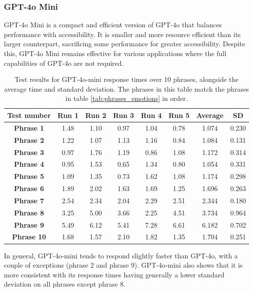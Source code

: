 \subsubsection{GPT-4o Mini}

GPT-4o Mini is a compact and efficient version of GPT-4o that balances performance with accessibility. It is smaller and more resource efficient than its larger counterpart, sacrificing some performance for greater accessibility. Despite this, GPT-4o Mini remains effective for various applications where the full capabilities of GPT-4o are not required.

\begin{table}[h!]
\centering{}
\caption{Test results for GPT-4o-mini response times over 10 phrases, alongside the average time and standard deviation. The phrases in this table match the phrases in table \ref{tab:phrases_emotions} in order.}
\begin{tabular}{|c|c|c|c|c|c|c|c|}
\hline
\textbf{Test number} & \textbf{Run 1} & \textbf{Run 2} & \textbf{Run 3} & \textbf{Run 4} & \textbf{Run 5} & \textbf{Average} & \textbf{SD} \\ \hline
\textbf{Phrase 1}  & 1.48 & 1.10 & 0.97 & 1.04 & 0.78 & 1.074 & 0.230          \\ \hline
\textbf{Phrase 2}  & 1.22 & 1.07 & 1.13 & 1.16 & 0.84 & 1.084 & 0.131          \\ \hline
\textbf{Phrase 3}  & 0.97 & 1.76 & 1.19 & 0.86 & 1.08 & 1.172 & 0.314          \\ \hline
\textbf{Phrase 4}  & 0.95 & 1.53 & 0.65 & 1.34 & 0.80 & 1.054 & 0.331          \\ \hline
\textbf{Phrase 5}  & 1.09 & 1.35 & 0.73 & 1.62 & 1.08 & 1.174 & 0.298          \\ \hline
\textbf{Phrase 6}  & 1.89 & 2.02 & 1.63 & 1.69 & 1.25 & 1.696 & 0.263          \\ \hline
\textbf{Phrase 7}  & 2.54 & 2.34 & 2.04 & 2.29 & 2.51 & 2.344 & 0.180          \\ \hline
\textbf{Phrase 8}  & 3.25 & 5.00 & 3.66 & 2.25 & 4.51 & 3.734 & 0.964          \\ \hline
\textbf{Phrase 9}  & 5.49 & 6.12 & 5.41 & 7.28 & 6.61 & 6.182 & 0.702          \\ \hline
\textbf{Phrase 10} & 1.68 & 1.57 & 2.10 & 1.82 & 1.35 & 1.704 & 0.251          \\ \hline
\end{tabular}
\label{tab:phrase_gpt4o-mini}
\end{table}

In general, GPT-4o-mini tends to respond slightly faster than GPT-4o, with a couple of exceptions (phrase 2 and phrase 9). GPT-4o-mini also shows that it is more consistent with its response times having generally a lower standard deviation on all phrases except phrase 8.
